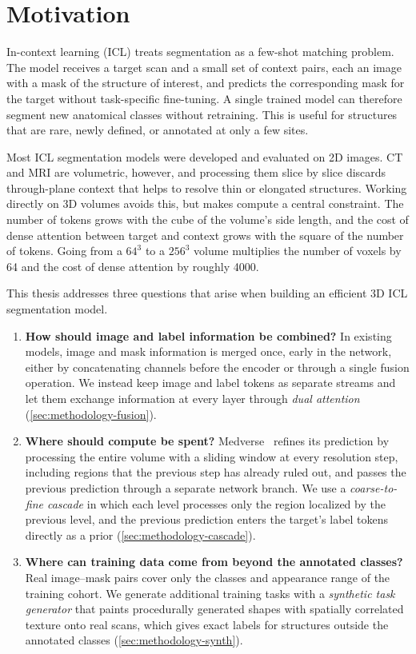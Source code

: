 \section{Motivation}\label{sec:motivation}

In-context learning (ICL) treats segmentation as a few-shot matching problem.
The model receives a target scan and a small set of context pairs, each an
image with a mask of the structure of interest, and predicts the corresponding
mask for the target without task-specific fine-tuning. A single trained model
can therefore segment new anatomical classes without retraining. This is useful
for structures that are rare, newly defined, or annotated at only a few sites.

Most ICL segmentation models were developed and evaluated on 2D images. CT and
MRI are volumetric, however, and processing them slice by slice discards
through-plane context that helps to resolve thin or elongated structures.
Working directly on 3D volumes avoids this, but makes compute a central
constraint. The number of tokens grows with the cube of the volume's side
length, and the cost of dense attention between target and context grows with
the square of the number of tokens. Going from a $64^3$ to a $256^3$ volume
multiplies the number of voxels by 64 and the cost of dense attention by
roughly 4000.

This thesis addresses three questions that arise when building an efficient
3D ICL segmentation model.

\begin{enumerate}[leftmargin=1.6em,itemsep=0.2em]
  \item \textbf{How should image and label information be combined?}
    In existing models, image and mask information is merged once, early in
    the network, either by concatenating channels before the encoder or through
    a single fusion operation. We instead keep image and label tokens as
    separate streams and let them exchange information at every layer through
    \emph{dual attention} (\autoref{sec:methodology-fusion}).
   \item \textbf{Where should compute be spent?}
    Medverse~\cite{huMedverseUniversalModel2025a} refines its prediction by
    processing the entire volume with a sliding window at every resolution
    step, including regions that the previous step has already ruled out, and
    passes the previous prediction through a separate network branch. We use a
    \emph{coarse-to-fine cascade} in which each level processes only the region
    localized by the previous level, and the previous prediction enters the
    target's label tokens directly as a prior
    (\autoref{sec:methodology-cascade}).
  \item \textbf{Where can training data come from beyond the annotated classes?}
    Real image--mask pairs cover only the classes and appearance range of the
    training cohort. We generate additional training tasks with a
    \emph{synthetic task generator} that paints procedurally generated shapes
    with spatially correlated texture onto real scans, which gives exact labels
    for structures outside the annotated classes
    (\autoref{sec:methodology-synth}).
\end{enumerate}

